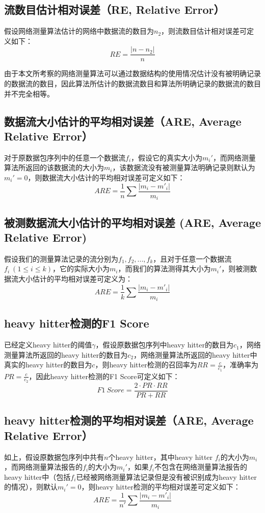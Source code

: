 \documentclass{article}
\begin{document}
\subsection{ 流数目估计相对误差（RE, Relative Error）}
假设网络测量算法估计的网络中数据流的数目为$n_2$，则流数目估计相对误差可定义如下：
$$
RE = \frac{|n - n_2|}{n}
$$

由于本文所考察的网络测量算法可以通过数据结构的使用情况估计没有被明确记录的数据流的数目，因此算法所估计的数据流数目和算法所明确记录的数据流的数目并不完全相等。

\subsection{ 数据流大小估计的平均相对误差（ARE, Average Relative Error）}
对于原数据包序列中的任意一个数据流$f_i$，假设它的真实大小为$m_i'$，而网络测量算法所返回的该数据流的大小为$m_i$，该数据流没有被测量算法明确记录则默认为$m_i'=0$，则数据流大小估计的平均相对误差可定义如下：
$$
ARE=\frac{1}{n}\sum\frac{|m_i - m'_i|}{m_i}
$$

\subsection{被测数据流大小估计的平均相对误差 (ARE, Average Relative Error)}
假设我们的测量算法记录的流分别为$f_1, f_2, ..., f_k$，且对于任意一个数据流$f_i ~(1 \le i \le k)$，它的实际大小为$m_i$，而我们的算法测得其大小为$m_i'$，则被测数据流大小估计的平均相对误差可定义为：
$$
ARE = \frac{1}{k}\sum\frac{|m_i - m'_i|}{m_i}
$$

\subsection{ heavy hitter检测的F1 Score}
已经定义heavy hitter的阈值$\gamma$，假设原数据包序列中heavy hitter的数目为$c_1$，网络测量算法所返回的heavy hitter的数目为$c_2$，网络测量算法所返回的heavy hitter中真实的heavy hitter的数目为$c$，则heavy hitter检测的召回率为$RR=\frac{c}{c_1}$，准确率为$PR=\frac{c}{c_2}$，因此heavy hitter检测的F1 Score可定义如下：
$$
F1~Score=\frac{2\cdot PR \cdot RR}{PR + RR}
$$

\subsection{ heavy hitter检测的平均相对误差（ARE, Average Relative Error）}
如上，假设原数据包序列中共有$n$个heavy hitter，其中heavy hitter $f_i$的大小为$m_i$，而网络测量算法报告的$f_i$的大小为$m_i'$，如果$f_i$不包含在网络测量算法报告的heavy hitter中（包括$f_i$已经被网络测量算法记录但是没有被识别成为heavy hitter的情况），则默认$m_i'=0$，则heavy hitter检测的平均相对误差可定义如下：
$$
ARE = \frac{1}{n'}\sum\frac{|m_i - m'_i|}{m_i}
$$
\end{document}
